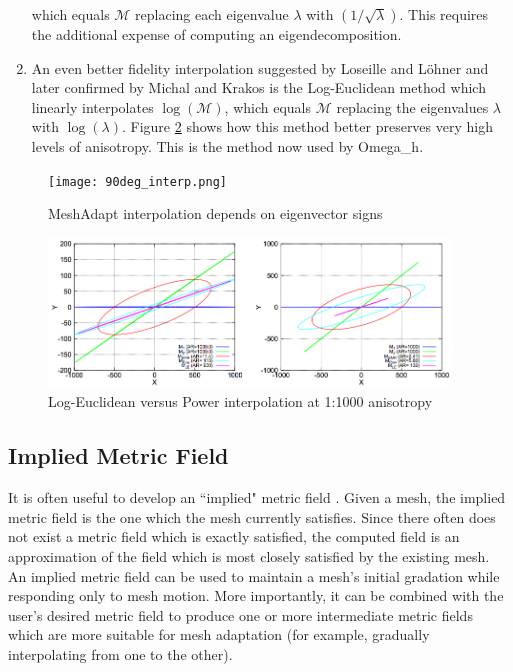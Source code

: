 \begin{enumerate}
which equals $\mathcal{M}$ replacing each eigenvalue $\lambda$
with $(1/\sqrt{\lambda})$.
This requires the additional expense of computing an eigendecomposition.
\item An even better fidelity interpolation suggested by Loseille and
L{\"o}hner \cite{loseille20093d} and later confirmed by
Michal and Krakos \cite{michal2012anisotropic} is the Log-Euclidean
method which linearly interpolates $\log(\mathcal{M})$, which equals
$\mathcal{M}$ replacing the eigenvalues $\lambda$ with $\log(\lambda)$.
Figure \ref{fig:log_interp} shows how this method better preserves
very high levels of anisotropy.
This is the method now used by Omega\_h.
\end{enumerate}

\begin{figure}
\begin{center}
\texttt{[image: 90deg\_interp.png]}
\caption{MeshAdapt interpolation depends on eigenvector signs}
\label{fig:90deg_interp}
\end{center}
\end{figure}

\begin{figure}
\begin{center}
\includegraphics[width=0.95\textwidth]{log_interp.png}
\caption{Log-Euclidean versus Power interpolation
at 1:1000 anisotropy \cite{michal2012anisotropic}}
\label{fig:log_interp}
\end{center}
\end{figure}

\subsection{Implied Metric Field}
\label{sec:ident_metric}

It is often useful to develop an ``implied" metric field
\cite{michal2012anisotropic}.
Given a mesh, the implied metric field is the one which the mesh
currently satisfies.
Since there often does not exist a metric field which is exactly
satisfied, the computed field is an approximation of the field
which is most closely satisfied by the existing mesh.
An implied metric field can be used to maintain a mesh's
initial gradation while responding only to mesh motion.
More importantly, it can be combined with the user's desired
metric field to produce one or more intermediate metric fields
which are more suitable for mesh adaptation
(for example, gradually interpolating from one to the other).


